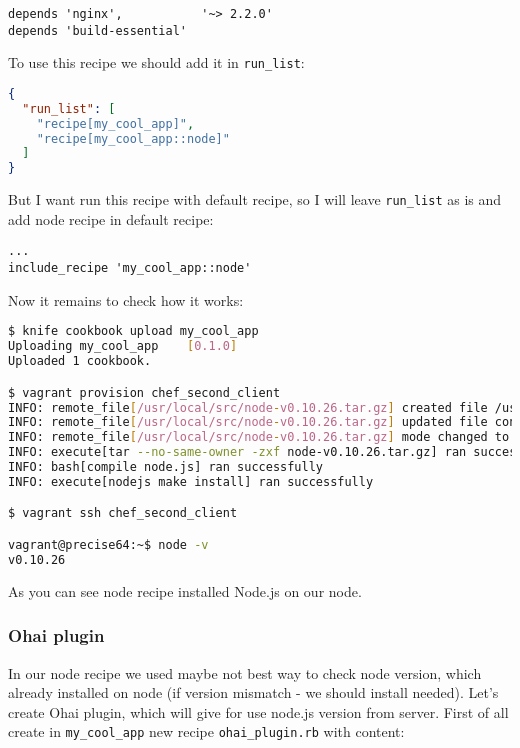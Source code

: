 \begin{lstlisting}[label=lst:cookbook-ohai-meta]
depends 'nginx',           '~> 2.2.0'
depends 'build-essential'
\end{lstlisting}

To use this recipe we should add it in \lstinline!run_list!:

\begin{lstlisting}[language=JSON,label=lst:cookbook-ohai2]
{
  "run_list": [
    "recipe[my_cool_app]",
    "recipe[my_cool_app::node]"
  ]
}
\end{lstlisting}

But I want run this recipe with default recipe, so I will leave \lstinline!run_list! as is and add node recipe in default recipe:

\begin{lstlisting}[label=lst:cookbook-ohai3]
...
include_recipe 'my_cool_app::node'
\end{lstlisting}

Now it remains to check how it works:

\begin{lstlisting}[language=Bash,label=lst:cookbook-ohai4]
$ knife cookbook upload my_cool_app
Uploading my_cool_app    [0.1.0]
Uploaded 1 cookbook.

$ vagrant provision chef_second_client
INFO: remote_file[/usr/local/src/node-v0.10.26.tar.gz] created file /usr/local/src/node-v0.10.26.tar.gz
INFO: remote_file[/usr/local/src/node-v0.10.26.tar.gz] updated file contents /usr/local/src/node-v0.10.26.tar.gz
INFO: remote_file[/usr/local/src/node-v0.10.26.tar.gz] mode changed to 644
INFO: execute[tar --no-same-owner -zxf node-v0.10.26.tar.gz] ran successfully
INFO: bash[compile node.js] ran successfully
INFO: execute[nodejs make install] ran successfully

$ vagrant ssh chef_second_client

vagrant@precise64:~$ node -v
v0.10.26
\end{lstlisting}

As you can see node recipe installed Node.js on our node.

\subsubsection{Ohai plugin}

In our node recipe we used maybe not best way to check node version, which already installed on node (if version mismatch - we should install needed). Let's create Ohai plugin, which will give for use node.js version from server. First of all create in \lstinline!my_cool_app! new recipe \lstinline!ohai_plugin.rb! with content:

